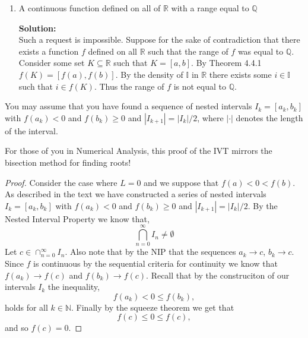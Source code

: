 \documentclass[12pt]{article}
\makeatletter
\theoremstyle{homework}
\newenvironment{exercise}[1]
{\def\@currentlabel{#1}\exercisecore}
{\endexercisecore}
\newcommand{\localhead}[1]{\par\smallskip\noindent\textbf{#1}\nobreak\\}%
\newcommand\solution{\localhead{Solution:}}
\newcommand{\Reals}{\ensuremath{\mathbb R}}
\newcommand{\Nats}{\ensuremath{\mathbb N}}
\newcommand{\Rats}{\ensuremath{\mathbb Q}}
\newcommand{\Irats}{\ensuremath{\mathbb I }}
\makeatother
\begin{document}
\begin{exercise}{Abbott 4.5.2}
\begin{enumerate}
  
     \item A continuous function defined on all of $\Reals$ with a range equal to $\Rats$\\
     \solution Such a request is impossible. Suppose for the sake of contradiction that there exists a function $f$ defined on all $\Reals$
such that the range of $f$ was equal to $\Rats$. Consider some set $K \subseteq \Reals$ such that $K = [a,b]$. By Theorem 4.4.1 $f(K) = [f(a), f(b)]$.
By the density of $\Irats$ in $\Reals$ there exists some $i \in \Irats$ such that $i \in f(K)$. Thus the range of $f$ is not equal to $\Rats$.

  \end{enumerate}

\end{exercise}
\vspace{.5in}

\begin{exercise}{Abbott 4.5.5 (b)}

You may assume that you have found a sequence of nested intervals $I_k=[a_k,b_k]$ with $f(a_k)<0$ and $f(b_k)\ge 0$ and $|I_{k+1}|=|I_k|/2$,
where $|\cdot|$ denotes the length of the interval.

For those of you in Numerical Analysis, this proof of the IVT 
mirrors the bisection method for finding roots!\\


\begin{proof}
  Consider the case where $L = 0$ and we suppose that $f(a) < 0 < f(b)$. As described in the text we have constructed
  a series of nested intervals $I_k=[a_k,b_k]$ with $f(a_k)<0$ and $f(b_k)\geq 0$ and $|I_{k+1}|=|I_k|/2$. By the Nested Interval Property
  we know that,
  \begin{equation*}
    \bigcap_{n = 0}^{\infty} I_n \neq \emptyset
  \end{equation*}
  Let $c \in \cap_{n = 0}^{\infty} I_n$. Also note that by the NIP that the sequences $a_k \to c$, $b_k \to c$.
  Since $f$ is continuous by the sequential criteria for continuity we know that $f(a_k) \to f(c)$ and $f(b_k) \to f(c)$. Recall that by the construciton of our intervals $I_k$ the inequality,
  \begin{equation*}
    f(a_k) < 0 \le f(b_k),
  \end{equation*} 
  holds for all $k \in \Nats$. Finally by the squeeze theorem we get that
  \begin{equation*}
    f(c) \le 0 \le f(c),
  \end{equation*}
  and so $f(c) = 0$. 
\end{proof}
\end{exercise}
\vspace{.5in}
\end{document}
